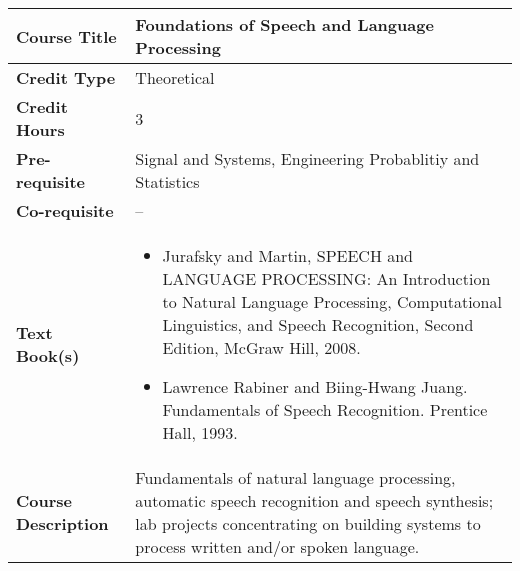 \documentclass[11pt]{article}
\begin{document}
\begin{table}[h!]
\begin{tabular}{|l|l|}
\hline
\textbf{Course Title}       &  Foundations of Speech and Language Processing \\ \hline
\textbf{Credit Type}        &   Theoretical \\ \hline
\textbf{Credit Hours}       & 3 \\ \hline
\textbf{Pre-requisite}       &  Signal and Systems, Engineering Probablitiy and Statistics\\ \hline
\textbf{Co-requisite}       &  -- \\ \hline
\textbf{Text Book(s)}       & \begin{minipage}{.70\textwidth}
\begin{itemize} \itemsep-0.4em
	\vspace{3mm}
	\item Jurafsky and Martin, SPEECH and LANGUAGE PROCESSING: An Introduction to Natural Language Processing, Computational Linguistics, and Speech Recognition, Second Edition, McGraw Hill, 2008.
	\item Lawrence Rabiner and Biing-Hwang Juang. Fundamentals of Speech Recognition. Prentice Hall, 1993.
	\vspace{3mm}
\end{itemize}
\end{minipage}\\ \hline
\textbf{Course Description} & \begin{minipage}{.70\textwidth}
\vspace{3mm}
Fundamentals of natural language processing, automatic speech recognition and speech synthesis; lab projects concentrating on building systems to process written and/or spoken language. 
\vspace{3mm}
\end{minipage} \\ \hline
\end{tabular}
\end{table}
\end{document}
